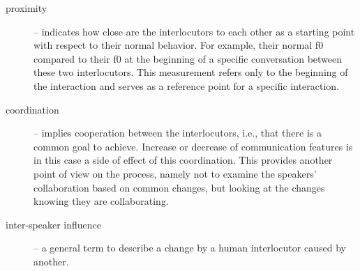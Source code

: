 \begin{description}
	\item[proximity] -- indicates how close are the interlocutors to each other as a starting point with respect to their normal behavior.
	For example, their normal \ac{f0} compared to their \ac{f0} at the beginning of a specific conversation between these two interlocutors.
	This measurement refers only to the beginning of the interaction and serves as a reference point for a specific interaction.
	
	\item[coordination] -- implies cooperation between the interlocutors, i.e., that there is a common goal to achieve.
	Increase or decrease of communication features is in this case a side of effect of this coordination.
	This provides another point of view on the process, namely not to examine the speakers' collaboration based on common changes, but looking at the changes knowing they are collaborating.
	
	\item[inter-speaker influence] -- a general term to describe a change by a human interlocutor caused by another.
\end{description}

